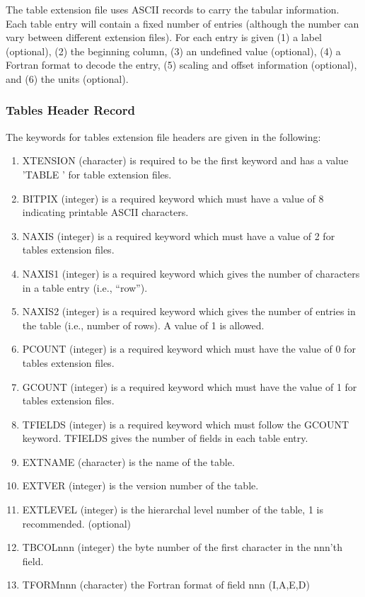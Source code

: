 The table extension file uses ASCII records to carry the tabular
information.  Each table entry will contain a fixed number of entries
(although the number can vary between different extension files). For
each entry is given (1) a label (optional), (2) the beginning column,
(3) an undefined value (optional), (4) a Fortran format to decode the
entry, (5) scaling and offset information (optional), and (6) the
units (optional).

\subsubsection{Tables Header Record }
The keywords for tables extension file headers are given in the
following:
\begin{enumerate} %
\item XTENSION (character) is required to be the first keyword and has a
value 'TABLE   ' for table extension files.
\item BITPIX (integer) is a required keyword which must have a value of 8
indicating printable ASCII characters.
\item NAXIS (integer) is a required keyword which must have a value of 2 for
tables extension files.
\item NAXIS1 (integer) is a required keyword which gives the number of
characters in a table entry (i.e., ``row'').
\item NAXIS2 (integer) is a required keyword which gives the number of
entries in the table (i.e., number of rows). A value of 1 is allowed.
\item PCOUNT (integer) is a required keyword which must have the value of 0
for tables extension files.
\item GCOUNT (integer) is a required keyword which must have the value of 1
for tables extension files.
\item TFIELDS (integer) is a required keyword which must follow the GCOUNT
keyword.  TFIELDS gives the number of fields in each table entry.
\item EXTNAME (character) is the name of the table.
\item EXTVER (integer) is the version number of the table.
\item EXTLEVEL (integer) is the hierarchal level number of the table, 1 is
recommended. (optional)
\item TBCOLnnn (integer) the byte number of the first character in the
nnn'th field.
\item TFORMnnn (character) the Fortran format of field nnn (I,A,E,D)

\end{enumerate}
